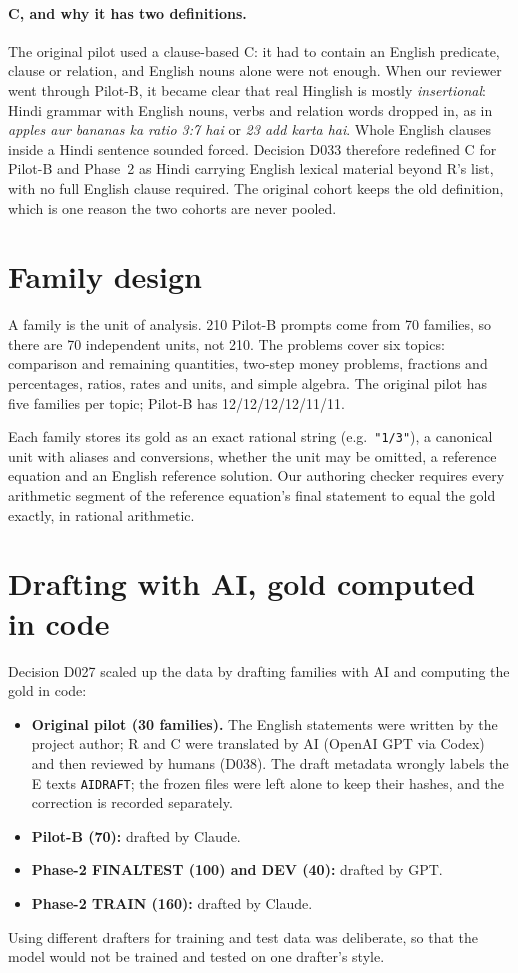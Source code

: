 \documentclass[12pt,a4paper,oneside]{report}
\renewcommand{\_}{\oldunderscore\allowbreak}
\begin{document}
\paragraph{C, and why it has two definitions.} The original pilot used a clause-based C: it had to contain an English predicate, clause or relation, and English nouns alone were not enough. When our reviewer went through Pilot-B, it became clear that real Hinglish is mostly \emph{insertional}: Hindi grammar with English nouns, verbs and relation words dropped in, as in \emph{apples aur bananas ka ratio 3:7 hai} or \emph{23 add karta hai}. Whole English clauses inside a Hindi sentence sounded forced. Decision D033 therefore redefined C for Pilot-B and Phase~2 as Hindi carrying English lexical material beyond R's list, with no full English clause required. The original cohort keeps the old definition, which is one reason the two cohorts are never pooled.

\section{Family design}

A family is the unit of analysis. 210 Pilot-B prompts come from 70 families, so there are 70 independent units, not 210. The problems cover six topics: comparison and remaining quantities, two-step money problems, fractions and percentages, ratios, rates and units, and simple algebra. The original pilot has five families per topic; Pilot-B has 12/12/12/12/11/11.

Each family stores its gold as an exact rational string (e.g.\ \texttt{"1/3"}), a canonical unit with aliases and conversions, whether the unit may be omitted, a reference equation and an English reference solution. Our authoring checker requires every arithmetic segment of the reference equation's final statement to equal the gold exactly, in rational arithmetic.

\section{Drafting with AI, gold computed in code}

Decision D027 scaled up the data by drafting families with AI and computing the gold in code:
\begin{itemize}
\item \textbf{Original pilot (30 families).} The English statements were written by the project author; R and C were translated by AI (OpenAI GPT via Codex) and then reviewed by humans (D038). The draft metadata wrongly labels the E texts \texttt{AI\_DRAFT}; the frozen files were left alone to keep their hashes, and the correction is recorded separately.
\item \textbf{Pilot-B (70):} drafted by Claude.
\item \textbf{Phase-2 FINAL\_TEST (100) and DEV (40):} drafted by GPT.
\item \textbf{Phase-2 TRAIN (160):} drafted by Claude.
\end{itemize}
Using different drafters for training and test data was deliberate, so that the model would not be trained and tested on one drafter's style.
\end{document}

